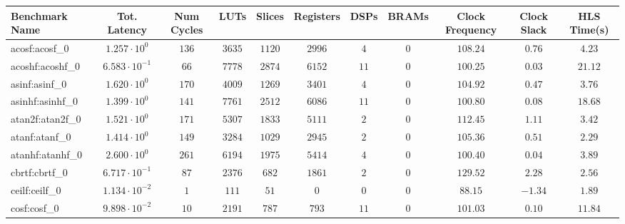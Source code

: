 \begin{tabular}{|l|c|c|c|c|c|c|c|c|c|c|}
\hline
Benchmark Name               & Tot. Latency            & Num Cycles & LUTs       & Slices    & Registers & DSPs    & BRAMs & Clock Frequency & Clock Slack & HLS Time(s) \\
\hline
acosf:acosf\_0               & $ 1.257 \cdot 10^{0}  $ & $ 136    $ & $ 3635   $ & $ 1120  $ & $ 2996  $ & $ 4   $ & $ 0 $ & $ 108.24      $ & $ 0.76    $ & $ 4.23    $ \\
acoshf:acoshf\_0             & $ 6.583 \cdot 10^{-1} $ & $ 66     $ & $ 7778   $ & $ 2874  $ & $ 6152  $ & $ 11  $ & $ 0 $ & $ 100.25      $ & $ 0.03    $ & $ 21.12   $ \\
asinf:asinf\_0               & $ 1.620 \cdot 10^{0}  $ & $ 170    $ & $ 4009   $ & $ 1269  $ & $ 3401  $ & $ 4   $ & $ 0 $ & $ 104.92      $ & $ 0.47    $ & $ 3.76    $ \\
asinhf:asinhf\_0             & $ 1.399 \cdot 10^{0}  $ & $ 141    $ & $ 7761   $ & $ 2512  $ & $ 6086  $ & $ 11  $ & $ 0 $ & $ 100.80      $ & $ 0.08    $ & $ 18.68   $ \\
atan2f:atan2f\_0             & $ 1.521 \cdot 10^{0}  $ & $ 171    $ & $ 5307   $ & $ 1833  $ & $ 5111  $ & $ 2   $ & $ 0 $ & $ 112.45      $ & $ 1.11    $ & $ 3.42    $ \\
atanf:atanf\_0               & $ 1.414 \cdot 10^{0}  $ & $ 149    $ & $ 3284   $ & $ 1029  $ & $ 2945  $ & $ 2   $ & $ 0 $ & $ 105.36      $ & $ 0.51    $ & $ 2.29    $ \\
atanhf:atanhf\_0             & $ 2.600 \cdot 10^{0}  $ & $ 261    $ & $ 6194   $ & $ 1975  $ & $ 5414  $ & $ 4   $ & $ 0 $ & $ 100.40      $ & $ 0.04    $ & $ 3.89    $ \\
cbrtf:cbrtf\_0               & $ 6.717 \cdot 10^{-1} $ & $ 87     $ & $ 2376   $ & $ 682   $ & $ 1861  $ & $ 2   $ & $ 0 $ & $ 129.52      $ & $ 2.28    $ & $ 2.56    $ \\
ceilf:ceilf\_0               & $ 1.134 \cdot 10^{-2} $ & $ 1      $ & $ 111    $ & $ 51    $ & $ 0     $ & $ 0   $ & $ 0 $ & $ 88.15       $ & $ -1.34   $ & $ 1.89    $ \\
cosf:cosf\_0                 & $ 9.898 \cdot 10^{-2} $ & $ 10     $ & $ 2191   $ & $ 787   $ & $ 793   $ & $ 11  $ & $ 0 $ & $ 101.03      $ & $ 0.10    $ & $ 11.84   $ \\

\end{tabular}
